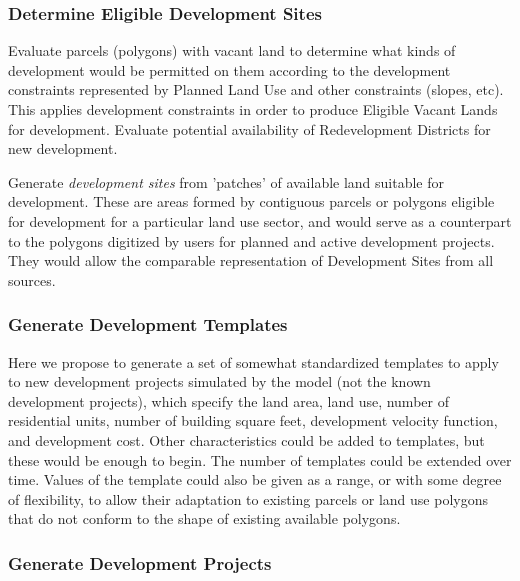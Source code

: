 \subsubsection{Determine Eligible Development Sites}

Evaluate parcels (polygons) with vacant land to determine what kinds of development would be
permitted on them
according to the development constraints represented by Planned Land Use and other constraints
(slopes, etc).  This applies development constraints in order to produce Eligible Vacant Lands for
development. Evaluate potential availability of Redevelopment Districts for new development.

Generate \emph{development sites} from 'patches' of available land suitable for development.
These are
areas formed by contiguous parcels or polygons eligible for development for a particular land use
sector, and would serve as a counterpart to the polygons digitized by users for planned and active
development projects.  They would allow the comparable representation of Development Sites from all
sources.

\subsubsection{Generate Development Templates}
Here we propose to generate a set of somewhat standardized templates to apply to new development
projects simulated by the model (not the known development projects), which specify the land area,
land use, number of residential units, number of building square feet, development velocity function,
and development cost.  Other characteristics could be added to templates, but these would be enough
to begin.  The number of templates could be extended over time.  Values of the template could also
be given as a range, or with some degree of flexibility, to allow their adaptation to existing parcels
or land use polygons that do not conform to the shape of existing available polygons.

\subsubsection{Generate Development Projects}

